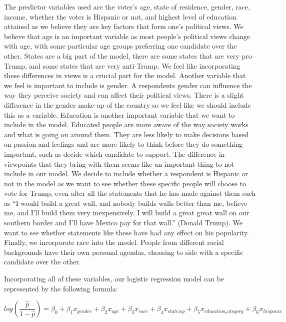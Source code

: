 \documentclass[
]{article}
\begin{document}
The predictor variables used are the voter's age, state of residence, gender, race, income, whether the voter is Hispanic or not, and highest level of education attained as we believe they are key factors that form one's political views. We believe that age is an important variable as most people's political views change with age, with some particular age groups preferring one candidate over the other. States are a big part of the model, there are some states that are very pro Trump, and some states that are very anti-Trump. We feel like incorporating these differences in views is a crucial part for the model. Another variable that we feel is important to include is gender. A respondents gender can influence the way they perceive society and can affect their political views. There is a slight difference in the gender make-up of the country so we feel like we should include this as a variable. Education is another important variable that we want to include in the model. Educated people are more aware of the way society works and what is going on around them. They are less likely to make decisions based on passion and feelings and are more likely to think before they do something important, such as decide which candidate to support. The difference in viewpoints that they bring with them seems like an important thing to not include in our model. We decide to include whether a respondent is Hispanic or not in the model as we want to see whether these specific people will choose to vote for Trump, even after all the statements that he has made against them such as ``I would build a great wall, and nobody builds walls better than me, believe me, and I'll build them very inexpensively. I will build a great great wall on our southern border and I'll have Mexico pay for that wall.'' (Donald Trump). We want to see whether statements like these have had any effect on his popularity. Finally, we incorporate race into the model. People from different racial backgrounds have their own personal agendas, choosing to side with a specific candidate over the other.

Incorporating all of these variables, our logistic regression model can be represented by the following formula:

\begin{equation}
  log(\frac{\hat{p}}{1 - \hat{p}}) = \beta_{0} + \beta_{1}x_{gender} +
\beta_{2}x_{age} + \beta_{3}x_{race} + \beta_{4}x_{stateicp} + \beta_{5}x_{education_category} +
\beta_{6}x_{hispanic}   \label{eq:logit}
\end{equation}
\end{document}
